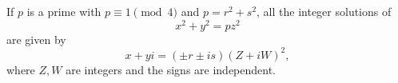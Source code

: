 \begin{proposition}
    If $p$ is a prime with $p\equiv1\pmod4$ and $p=r^2+s^2$, all the integer solutions of
\[
    x^2+y^2=pz^2
\]
    are given by
\[
    x+yi=(\pm r\pm is)(Z+iW)^2,
\]
    where $Z,W$ are integers and the signs are independent.
\end{proposition}
